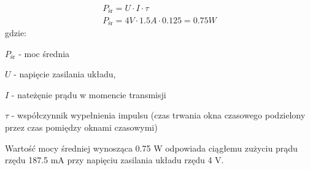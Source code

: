 \begin{gather}
 	P_{\text{śr}} = U \cdot I \cdot \tau \\
 	P_{\text{śr}} = 4 V \cdot 1.5 A \cdot 0.125 = 0.75 W \nonumber 	
 	\label{eq_gsm_power_mean} 
\end{gather}
 gdzie:
 
 $P_{\text{śr}} $ - moc średnia
 
 $U$ - napięcie zasilania układu,
 
 $I$ - nateżęnie prądu w momencie transmisji
 
 $\tau$ - współczynnik wypełnienia impulsu (czas trwania okna czasowego podzielony przez czas pomiędzy oknami czasowymi)
 
Wartość mocy średniej wynosząca 0.75 W odpowiada ciągłemu zużyciu prądu rzędu 187.5 mA przy napięciu zasilania układu rzędu 4 V. 


